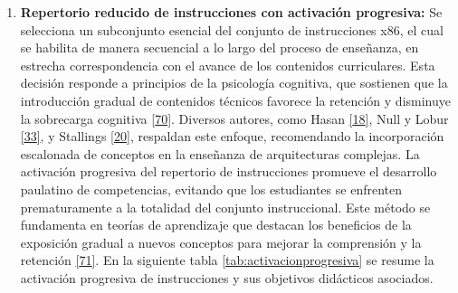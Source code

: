 \documentclass[12pt,oneside]{templates/unerthesis}
\providecommand{\tightlist}{%
  \setlength{\itemsep}{0pt}\setlength{\parskip}{0pt}}
\begin{document}
\begin{enumerate}
\def\labelenumi{\arabic{enumi}.}
\setcounter{enumi}{2}
\tightlist
\item
  \textbf{Repertorio reducido de instrucciones con activación progresiva:}
  Se selecciona un subconjunto esencial del conjunto de instrucciones x86, el cual se habilita de manera secuencial a lo largo del proceso de enseñanza, en estrecha correspondencia con el avance de los contenidos curriculares. Esta decisión responde a principios de la psicología cognitiva, que sostienen que la introducción gradual de contenidos técnicos favorece la retención y disminuye la sobrecarga cognitiva \protect\hyperlink{ref-nationalacademies2018how}{{[}70{]}}. Diversos autores, como Hasan \protect\hyperlink{ref-hasan_survey_2012}{{[}18{]}}, Null y Lobur \protect\hyperlink{ref-null_essentials_2023}{{[}33{]}}, y Stallings \protect\hyperlink{ref-stallings_computer_2021}{{[}20{]}}, respaldan este enfoque, recomendando la incorporación escalonada de conceptos en la enseñanza de arquitecturas complejas.
  La activación progresiva del repertorio de instrucciones promueve el desarrollo paulatino de competencias, evitando que los estudiantes se enfrenten prematuramente a la totalidad del conjunto instruccional. Este método se fundamenta en teorías de aprendizaje que destacan los beneficios de la exposición gradual a nuevos conceptos para mejorar la comprensión y la retención \protect\hyperlink{ref-sweller2010cognitive}{{[}71{]}}. En la siguiente tabla \ref{tab:activacionprogresiva} se resume la activación progresiva de instrucciones y sus objetivos didácticos asociados.
\end{enumerate}

\begin{table}[!h]
\centering
\caption{\label{tab:activacionprogresiva}Activación progresiva del repertorio de instrucciones}
\centering
{}
\end{table}
\end{document}
